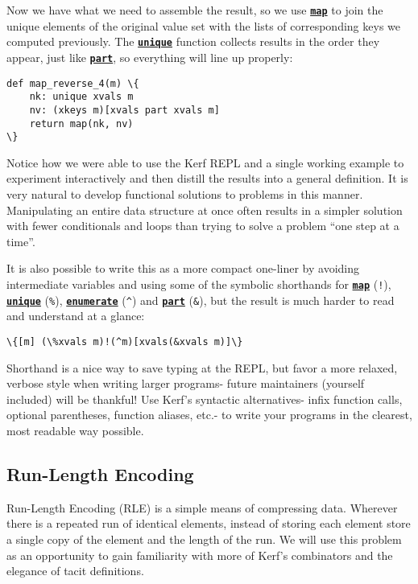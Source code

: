 \documentclass{article}
\newcommand{\primu}[2]{\hyperref[prim:#2]{\textbf{\texttt{#1}}}}
\newcommand{\prim}[1]{\primu{#1}{#1}}
\begin{document}
Now we have what we need to assemble the result, so we use \prim{map} to join the unique elements of the original value set with the lists of corresponding keys we computed previously. The \prim{unique} function collects results in the order they appear, just like \prim{part}, so everything will line up properly:
\begin{Verbatim}
def map_reverse_4(m) \{
	nk: unique xvals m
	nv: (xkeys m)[xvals part xvals m]
	return map(nk, nv)
\}
\end{Verbatim}

Notice how we were able to use the Kerf REPL and a single working example to experiment interactively and then distill the results into a general definition. It is very natural to develop functional solutions to problems in this manner. Manipulating an entire data structure at once often results in a simpler solution with fewer conditionals and loops than trying to solve a problem ``one step at a time''.

\vspace{0.5cm}

It is also possible to write this as a more compact one-liner by avoiding intermediate variables and using some of the symbolic shorthands for \prim{map} (\texttt{!}), \prim{unique} (\texttt{\%}), \prim{enumerate} (\texttt{\textasciicircum}) and \prim{part} (\texttt{\&}), but the result is much harder to read and understand at a glance:
\begin{Verbatim}
\{[m] (\%xvals m)!(^m)[xvals(&xvals m)]\}
\end{Verbatim}

Shorthand is a nice way to save typing at the REPL, but favor a more relaxed, verbose style when writing larger programs- future maintainers (yourself included) will be thankful! Use Kerf's syntactic alternatives- infix function calls, optional parentheses, function aliases, etc.- to write your programs in the clearest, most readable way possible.

\pagebreak
\subsection{Run-Length Encoding}
Run-Length Encoding (RLE) is a simple means of compressing data. Wherever there is a repeated run of identical elements, instead of storing each element store a single copy of the element and the length of the run. We will use this problem as an opportunity to gain familiarity with more of Kerf's combinators and the elegance of tacit definitions.
\end{document}
